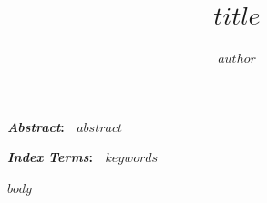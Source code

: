 \documentclass[journal]{IEEEtran}
\renewenvironment{abstract}{\normalfont\bfseries\footnotesize\noindent\textit{Abstract}:\ \ignorespaces}{\par\vspace{0.6\baselineskip}}
\renewenvironment{IEEEkeywords}{\normalfont\bfseries\footnotesize\noindent\textit{Index Terms}:\ \ignorespaces}{\par\vspace{0.6\baselineskip}}
\begin{document}
\title{$title$}
\author{$author$}
\maketitle
\begin{abstract}
$abstract$
\end{abstract}
\begin{IEEEkeywords}
$keywords$
\end{IEEEkeywords}
$body$


\end{document}
